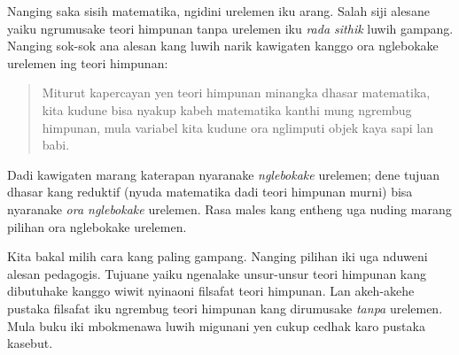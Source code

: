 \documentclass[../../../include/open-logic-section]{subfiles}
\begin{document}
Nanging saka sisih matematika, ngidini urelemen iku arang.
Salah siji alesane yaiku ngrumusake teori himpunan tanpa
urelemen iku \emph{rada sithik} luwih gampang. Nanging
sok-sok ana alesan kang luwih narik kawigaten kanggo
ora nglebokake urelemen ing teori himpunan:
\begin{quote}
	Miturut kapercayan yen teori himpunan minangka dhasar
	matematika, kita kudune bisa nyakup kabeh matematika
	kanthi mung ngrembug himpunan, mula variabel kita kudune
	ora nglimputi objek kaya sapi lan babi.
	\citep[p.~8]{Kunen1980}
\end{quote}
Dadi kawigaten marang katerapan nyaranake \emph{nglebokake}
urelemen; dene tujuan dhasar kang reduktif (nyuda
matematika dadi teori himpunan murni) bisa nyaranake
\emph{ora nglebokake} urelemen. Rasa males kang entheng
uga nuding marang pilihan ora nglebokake urelemen.

Kita bakal milih cara kang paling gampang. Nanging pilihan
iki uga nduweni alesan pedagogis. Tujuane yaiku ngenalake
unsur-unsur teori himpunan kang dibutuhake kanggo wiwit
nyinaoni filsafat teori himpunan. Lan akeh-akehe pustaka
filsafat iku ngrembug teori himpunan kang dirumusake
\emph{tanpa} urelemen. Mula buku iki mbokmenawa luwih
migunani yen cukup cedhak karo pustaka kasebut.
\end{document}
